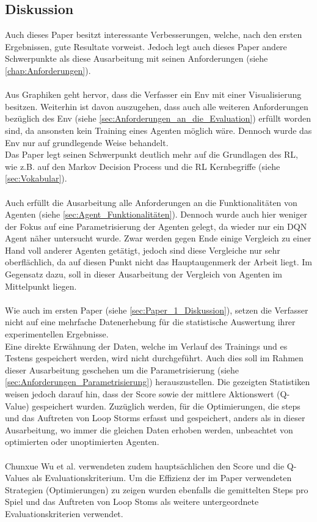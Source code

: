 \subsection{Diskussion}\label{sec:Paper_2_Diskussion}
Auch dieses Paper besitzt interessante Verbesserungen, welche, nach den ersten Ergebnissen, gute Resultate vorweist. Jedoch legt auch dieses Paper andere Schwerpunkte als diese Ausarbeitung mit seinen Anforderungen (siehe \ref{chap:Anforderungen}).\\
\\Aus Graphiken geht hervor, dass die Verfasser ein Env mit einer Visualisierung besitzen. Weiterhin ist davon auszugehen, dass auch alle weiteren Anforderungen bezüglich des Env (siehe \ref{sec:Anforderungen_an_die_Evaluation}) erfüllt worden sind, da ansonsten kein Training eines Agenten möglich wäre. Dennoch wurde das Env nur auf grundlegende Weise behandelt.\\
Das Paper legt seinen Schwerpunkt deutlich mehr auf die Grundlagen des RL, wie z.B. auf den Markov Decision Process und die RL Kernbegriffe (siehe \ref{sec:Vokabular}).\\
\\Auch erfüllt die Ausarbeitung alle Anforderungen an die Funktionalitäten von Agenten (siehe \ref{sec:Agent_Funktionalitäten}). Dennoch wurde auch hier weniger der Fokus auf eine Parametrisierung der Agenten gelegt, da wieder nur ein DQN Agent näher untersucht wurde. Zwar werden gegen Ende einige Vergleich zu einer Hand voll anderer Agenten getätigt, jedoch sind diese Vergleiche nur sehr oberflächlich, da auf diesen Punkt nicht das Hauptaugenmerk der Arbeit liegt. 
Im Gegensatz dazu, soll in dieser Ausarbeitung der Vergleich von Agenten im Mittelpunkt liegen.\\
\\Wie auch im ersten Paper (siehe \ref{sec:Paper_1_Diskussion}), setzen die Verfasser nicht auf eine mehrfache Datenerhebung für die statistische Auswertung ihrer experimentellen Ergebnisse.\\
Eine direkte Erwähnung der Daten, welche im Verlauf des Trainings und es Testens gespeichert werden, wird nicht durchgeführt. Auch dies soll im Rahmen dieser Ausarbeitung geschehen um die Parametrisierung (siehe \ref{sec:Anforderungen_Parametrisierung}) herauszustellen.  
Die gezeigten Statistiken weisen jedoch darauf hin, dass der Score sowie der mittlere Aktionswert (Q-Value) gespeichert wurden. Zuzüglich werden, für die Optimierungen, die steps und das Auftreten von Loop Storms erfasst und gespeichert, anders als in dieser Ausarbeitung, wo immer die gleichen Daten erhoben werden, unbeachtet von optimierten oder unoptimierten Agenten.\\
\\Chunxue Wu et al. verwendeten zudem hauptsächlichen den Score und die Q-Values als Evaluationskriterium. Um die Effizienz der im Paper verwendeten Strategien (Optimierungen) zu zeigen wurden ebenfalls die gemittelten Steps pro Spiel und das Auftreten von Loop Stoms als weitere untergeordnete Evaluationskriterien verwendet.



